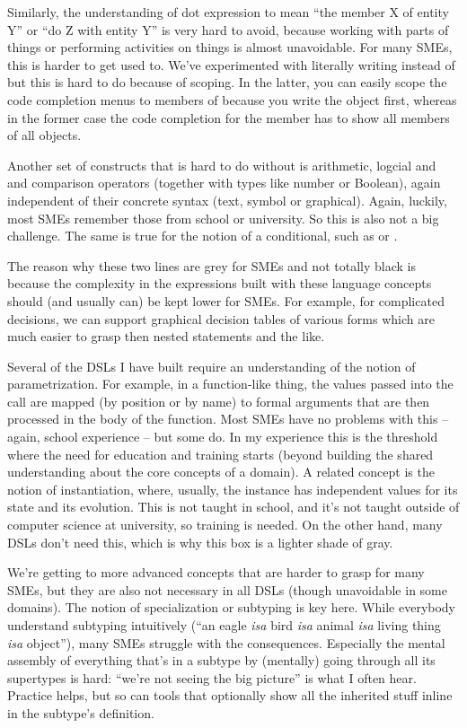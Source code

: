 \documentclass[runningheads]{llncs}
\newcommand{\ic}[1]{\changefont{cmtt}{m}{n}{#1}\normalfont}  %
\newcommand{\changefont}[3]{\fontfamily{#1}\fontseries{#2}\fontshape{#3}\selectfont}
\begin{document}
Similarly, the understanding of dot expression to mean ``the member X of entity
Y'' or ``do Z with entity Y'' is very hard to avoid, because working with parts
of things or performing activities on things is almost unavoidable. For many
SMEs, this is harder to get used to. We've experimented with literally writing
\ic{member of object} instead of \ic{object.member} but this is hard to do 
because of scoping. In the latter, you can easily scope the code completion
menus to members of \ic{object} because you write the object first, whereas
in the former case the code completion for the member has to show all members
of all objects.

Another set of constructs that is hard to do without is arithmetic, logcial
and and comparison operators (together with types like number or Boolean), 
again independent of their concrete syntax (text, symbol or graphical). Again,
luckily, most SMEs remember those from school or university. So this is also
not a big challenge. The same is true for the notion of a conditional, such
as \ic{if \ldots then} or \ic{switch\{case, case, case\}}. 

The reason why these two lines are grey for SMEs and not totally black is
because the complexity in the expressions built with these language concepts
should (and usually can) be kept lower for SMEs. For example, for complicated
decisions, we can support graphical decision tables of various forms which are
much easier to grasp then nested \ic{if} statements and the like. 

Several of the DSLs I have built require an understanding of the notion of
parametrization. For example, in a function-like thing, the values passed into
the call are mapped (by position or by name) to formal arguments that are then
processed in the body of the function. Most SMEs have no problems with this
-- again, school experience -- but some do. In my experience this is the 
threshold where the need for education and training starts (beyond building
the shared understanding about the core concepts of a domain). A related
concept is the notion of instantiation, where, usually, the instance has
independent values for its state and its evolution. This is not taught in
school, and it's not taught outside of computer science at university, so
training is needed. On the other hand, many DSLs don't need this, which is
why this box is a lighter shade of gray.

We're getting to more advanced concepts that are harder to grasp for many SMEs,
but they are also not necessary in all DSLs (though unavoidable in some
domains). The notion of specialization or subtyping is key here. While everybody
understand subtyping intuitively (``an eagle \emph{isa} bird \emph{isa} animal
\emph{isa} living thing \emph{isa} object''), many SMEs struggle with the
consequences. Especially the mental assembly of everything that's in a subtype
by (mentally) going through all its supertypes is hard: ``we're not seeing
the big picture'' is what I often hear. Practice helps, but so can tools that
optionally show all the inherited stuff inline in the subtype's definition.
\end{document}
